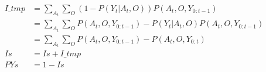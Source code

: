 




 

 
 
 \begin{align}
  I\_tmp &= \sum\limits_{A_t}\sum\limits_{O} (1 - P(Y_t|A_t,O)) P(A_t,O,Y_{0:t-1})\\
         &= \sum\limits_{A_t}\sum\limits_{O} P(A_t,O,Y_{0:t-1}) - P(Y_t|A_t,O)P(A_t,O,Y_{0:t-1})\\
         &= \sum\limits_{A_t}\sum\limits_{O} P(A_t,O,Y_{0:t-1}) - P(A_t,O,Y_{0:t})\\
  Is     &= Is + I\_tmp \\
  PYs   &= 1 - Is
 \end{align}

 
 
